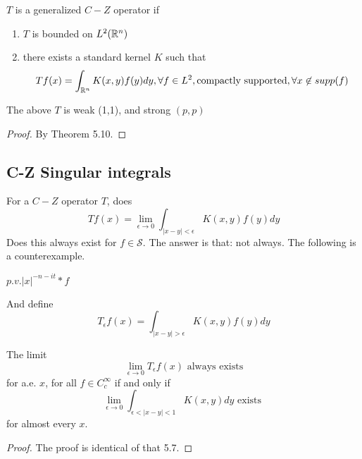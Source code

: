 \begin{definition}
    $T$ is a generalized $C-Z$ operator if 
    \begin{enumerate}
        \item $T$ is bounded on $L^2(\mathbb{R}^n)$
        \item there exists a standard kernel $K$ such that 
            \begin{equation*}
            Tf(x)=\int_{\mathbb{R}^n}K(x,y)f(y)dy, \forall f\in L^2, \text{compactly supported}, \forall x\not\in supp(f)
            \end{equation*}
    \end{enumerate}
\end{definition}
\begin{theorem}
    The above $T$ is  weak (1,1), and strong $(p,p)$
\end{theorem}
\begin{proof}
    By Theorem 5.10.
\end{proof}

\subsection{C-Z Singular integrals}
For a $C-Z$ operator $T$, does 
\begin{equation*}
    Tf(x)=\lim_{\epsilon\to 0}\int_{|x-y|<\epsilon}K(x,y)f(y)dy
\end{equation*}
Does this always exist for $f\in\mathcal{S}$. The answer is that: not always. The following is a counterexample.
\begin{example}
    $p.v. |x|^{-n-it}\ast f$
\end{example}
And  define 
\begin{equation*}
    T_\epsilon f(x)=\int_{|x-y|>\epsilon}K(x,y)f(y)dy
\end{equation*}

\begin{proposition}
    The limit 
    \begin{equation*}
        \lim_{\epsilon\to 0}T_\epsilon f(x) \text{ always exists}
    \end{equation*}
    for a.e. $x$, for all $f\in C_c^\infty$ if and only if 
    \begin{equation*}
        \lim_{\epsilon\to 0}\int_{\epsilon<|x-y|<1}K(x,y)dy \text{ exists }
    \end{equation*}
    for almost every $x$.
\end{proposition}
\begin{proof}
    The proof is identical of that 5.7.
\end{proof}

